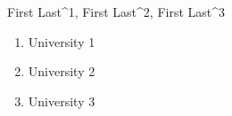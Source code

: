 First Last^{1}, First Last^{2}, First Last^{3}

\begin{enumerate}
\item University 1
\item University 2
\item University 3
\end{enumerate}
